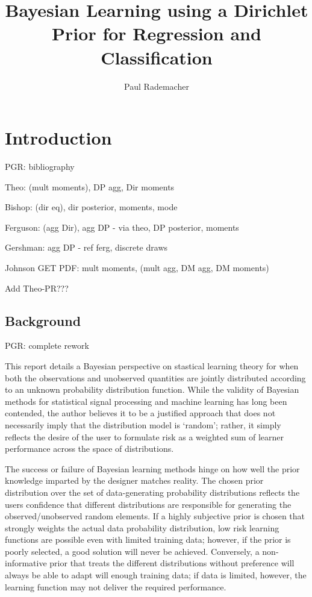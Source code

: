 \documentclass[12pt]{report}
\title{Bayesian Learning using a Dirichlet Prior for Regression and Classification}
\author{Paul Rademacher}
\begin{document}
\maketitle
\tableofcontents

\chapter{Introduction}


PGR: bibliography

Theo: (mult moments), DP agg, Dir moments

Bishop: (dir eq), dir posterior, moments, mode

Ferguson: (agg Dir), agg DP - via theo, DP posterior, moments

Gershman: agg DP - ref ferg, discrete draws

Johnson GET PDF: mult moments, (mult agg, DM agg, DM moments)

Add Theo-PR???




\section{Background}

PGR: complete rework

This report details a Bayesian perspective on stastical learning theory for when both the observations and unobserved quantities are jointly distributed according to an unknown probability distribution function. While the validity of Bayesian methods for statistical signal processing and machine learning has long been contended, the author believes it to be a justified approach that does not necessarily imply that the distribution model is `random'; rather, it simply reflects the desire of the user to formulate risk as a weighted sum of learner performance across the space of distributions. 

The success or failure of Bayesian learning methods hinge on how well the prior knowledge imparted by the designer matches reality. The chosen prior distribution over the set of data-generating probability distributions reflects the users confidence that different distributions are responsible for generating the observed/unobserved random elements. If a highly subjective prior is chosen that strongly weights the actual data probability distribution, low risk learning functions are possible even with limited training data; however, if the prior is poorly selected, a good solution will never be achieved. Conversely, a non-informative prior that treats the different distributions without preference will always be able to adapt will enough training data; if data is limited, however, the learning function may not deliver the required performance.
\end{document}
